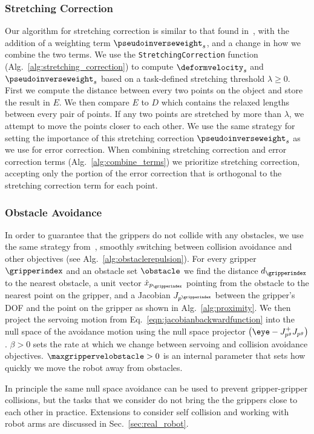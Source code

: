 \subsubsection{Stretching Correction}

Our algorithm for stretching correction is similar to that found in~\cite{Berenson2013}, with the addition of a weighting term $\pseudoinverseweight_s$, and a change in how we combine the two terms. We use the \texttt{StretchingCorrection} function (Alg.~\ref{alg:stretching_correction}) to compute $\deformvelocity_s$ and $\pseudoinverseweight_s$ based on a task-defined stretching threshold $\lambda \geq 0$. First we compute the distance between every two points on the object and store the result in $E$. We then compare $E$ to $D$ which contains the relaxed lengths between every pair of points. If any two points are stretched by more than $\lambda$, we attempt to move the points closer to each other. We use the same strategy for setting the importance of this stretching correction $\pseudoinverseweight_s$ as we use for error correction. When combining stretching correction and error correction terms (Alg.~\ref{alg:combine_terms}) we prioritize stretching correction, accepting only the portion of the error correction that is orthogonal to the stretching correction term for each point.

\subsubsection{Obstacle Avoidance}

In order to guarantee that the grippers do not collide with any obstacles, we use the same strategy from~\cite{Berenson2013}, smoothly switching between collision avoidance and other objectives (see Alg.~\ref{alg:obstaclerepulsion}). For every gripper $\gripperindex$ and an obstacle set $\obstacle$ we find the distance $d_\gripperindex$ to the nearest obstacle, a unit vector $\dot x_{p_\gripperindex}$ pointing from the obstacle to the nearest point on the gripper, and a Jacobian $J_{p^\gripperindex}$ between the gripper's DOF and the point on the gripper as shown in Alg.~\ref{alg:proximity}. We then project the servoing motion from Eq.~\eqref{eqn:jacobianbackwardfunction} into the null space of the avoidance motion using the null space projector $\left(\eye - J_{p^g}^+ J_{p^g} \right)$. $\beta > 0$ sets the rate at which we change between servoing and collision avoidance objectives. $\maxgrippervelobstacle > 0$ is an internal parameter that sets how quickly we move the robot away from obstacles.

In principle the same null space avoidance can be used to prevent gripper-gripper collisions, but the tasks that we consider do not bring the the grippers close to each other in practice. Extensions to consider self collision and working with robot arms are discussed in Sec.~\ref{sec:real_robot}.